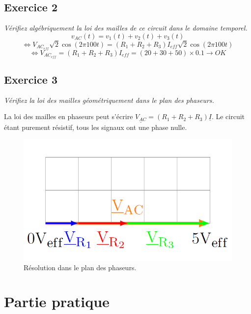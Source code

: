 \subsection{Exercice 2}
\Question
{
\textit{Vérifiez algébriquement la loi des mailles de ce circuit dans le domaine temporel.}}
{$$v_{AC}(t)=v_1(t)+v_2(t)+v_3(t)$$
$$\iff V_{AC_{eff}}\sqrt{2}\cos(2\pi100t)=(R_1+R_2+R_3)I_{eff}\sqrt{2}\cos(2\pi100t)$$
$$ \iff V_{AC_{eff}}=(R_1+R_2+R_3)I_{eff}=(20+30+50)\times 0.1 \longrightarrow OK$$}
\subsection{Exercice 3}
\Question
{\textit{Vérifiez la loi des mailles géométriquement dans le plan des phaseurs.}}
{La loi des mailles en phaseurs peut s'écrire $\underline{V_{AC}}=(R_1+R_2+R_3)\underline{I}$. Le circuit étant purement résistif, tous les signaux ont une phase nulle.
\begin{figure}[h!]
    \centering
    \includegraphics[scale=0.3]{LABO1A/plan_phaseur.PNG}
    \caption{Résolution dans le plan des phaseurs.}
    \label{fig:plan_phaseur}
\end{figure}}
\newpage
\section{Partie pratique}
